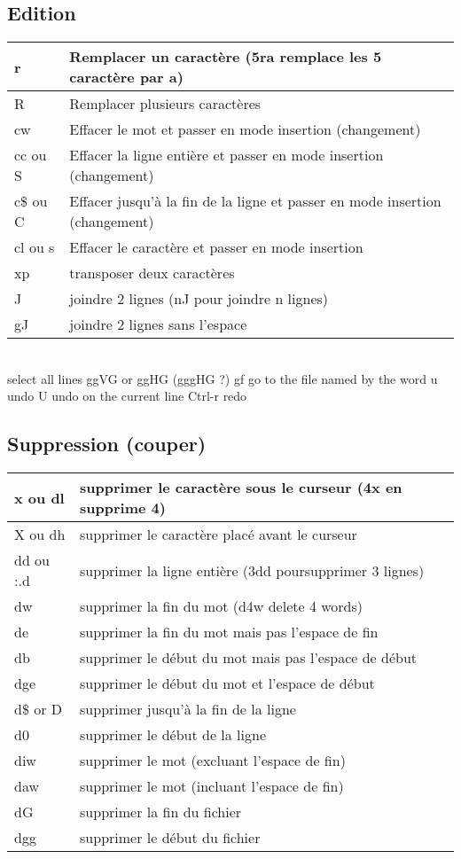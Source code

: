 \documentclass{article}
\begin{document}
\subsection{Edition}
\begin{tabular}{|p{3cm}| l|  }
	\hline
	r & Remplacer un caractère (5ra remplace les 5 caractère par a)\\ \hline
	R & Remplacer plusieurs caractères\\ \hline
	cw & Effacer le mot et passer en mode insertion (changement)\\ \hline
	cc ou S & Effacer la ligne entière et passer en mode insertion (changement)\\ \hline
	c\$ ou C & Effacer jusqu'à la fin de la ligne et passer en mode insertion (changement)\\ \hline
	cl ou s  & Effacer le caractère et passer en mode insertion \\ \hline
	xp & transposer deux caractères\\ \hline
	J & joindre 2 lignes (nJ pour joindre n lignes)\\ \hline
	gJ  &joindre 2 lignes sans l'espace\\ \hline
\end{tabular}\\

	select all lines ggVG or ggHG (gggHG ?)
	gf go to the file named by the word
	u undo
	U undo on the current line
	Ctrl-r redo
    
\subsection{Suppression (couper)}
\begin{tabular}{|p{3cm}| l|  }\hline
x ou dl & supprimer le caractère sous le curseur (4x en supprime 4)\\ \hline
X ou dh & supprimer le caractère placé avant le curseur\\ \hline
dd ou :.d & supprimer la ligne entière (3dd poursupprimer 3 lignes)\\ \hline
dw & supprimer la fin du mot (d4w delete 4 words)\\ \hline
de & supprimer la fin du mot mais pas l'espace de fin \\ \hline
db & supprimer le début du mot mais pas l'espace de début\\ \hline
dge & supprimer le début du mot et l'espace de début\\ \hline
d\$ or D & supprimer jusqu'à la fin de la ligne\\ \hline
d0 & supprimer le début de la ligne\\ \hline
diw & supprimer le mot (excluant l'espace de fin)\\ \hline
daw & supprimer le mot (incluant l'espace de fin)\\ \hline
dG & supprimer la fin du fichier\\ \hline
dgg & supprimer le début du fichier\\ \hline
\end{tabular}\\
\end{document}
